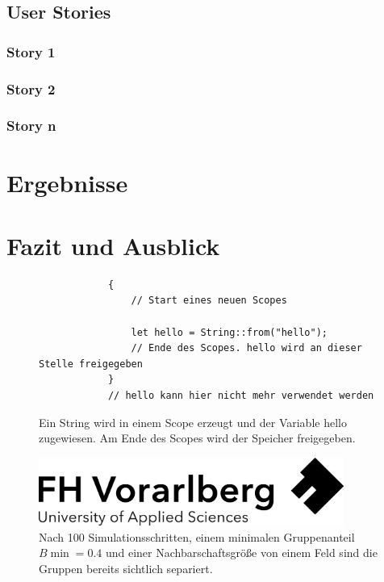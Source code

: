 \documentclass[a4paper, fontsize=11pt, parskip=half, twoside]{scrreprt}
\begin{document}
	\section{User Stories}
	
	\subsection{Story 1}
	
	\subsection{Story 2}
	
	\subsection{Story n}
	
	
	
	\chapter{Ergebnisse}
	
	
	
	\chapter{Fazit und Ausblick}
	
	
	
	\begin{figure}[ht]
		\begin{verbatim}
			{
				// Start eines neuen Scopes
				
				let hello = String::from("hello");
				// Ende des Scopes. hello wird an dieser Stelle freigegeben
			}
			// hello kann hier nicht mehr verwendet werden
		\end{verbatim}
		\caption{Ein String wird in einem Scope erzeugt und der Variable hello zugewiesen. Am Ende des Scopes wird der Speicher freigegeben.}
		\label{fig:drop:example}
	\end{figure}
	
	\begin{figure}[H]
		\centering
		\includegraphics[width = 10cm]{assets/Logo-A3.jpg}
		\caption{Nach 100 Simulationsschritten, einem minimalen Gruppenanteil $B{\min} = 0.4$ und einer Nachbarschaftsgröße von einem Feld sind die Gruppen bereits sichtlich separiert.}
		\label{fig:schelling_end}
	\end{figure}
	
\end{document}
